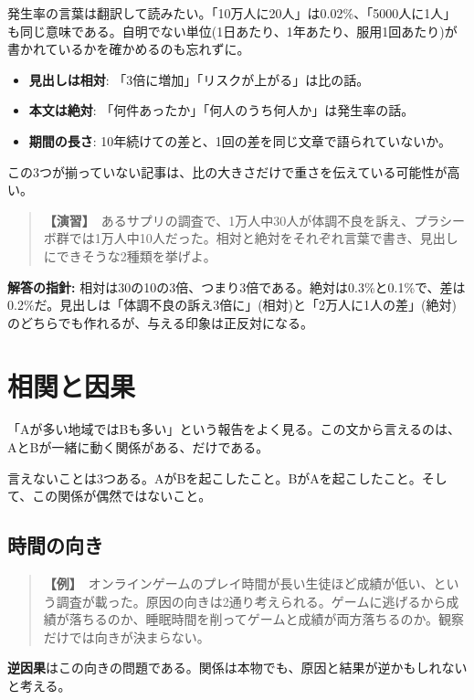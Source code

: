 \documentclass{article}
\begin{document}
発生率の言葉は翻訳して読みたい。「10万人に20人」は0.02\%、「5000人に1人」も同じ意味である。自明でない単位(1日あたり、1年あたり、服用1回あたり)が書かれているかを確かめるのも忘れずに。

\begin{itemize}
\item \textbf{見出しは相対}: 「3倍に増加」「リスクが上がる」は比の話。
\item \textbf{本文は絶対}: 「何件あったか」「何人のうち何人か」は発生率の話。
\item \textbf{期間の長さ}: 10年続けての差と、1回の差を同じ文章で語られていないか。
\end{itemize}

この3つが揃っていない記事は、比の大きさだけで重さを伝えている可能性が高い。

\begin{quote}
\textbf{【演習】}\ あるサプリの調査で、1万人中30人が体調不良を訴え、プラシーボ群では1万人中10人だった。相対と絶対をそれぞれ言葉で書き、見出しにできそうな2種類を挙げよ。
\end{quote}

\textbf{解答の指針:} 相対は30の10の3倍、つまり3倍である。絶対は0.3\%と0.1\%で、差は0.2\%だ。見出しは「体調不良の訴え3倍に」(相対)と「2万人に1人の差」(絶対)のどちらでも作れるが、与える印象は正反対になる。

\section{相関と因果}

「Aが多い地域ではBも多い」という報告をよく見る。この文から言えるのは、AとBが一緒に動く関係がある、だけである。

言えないことは3つある。AがBを起こしたこと。BがAを起こしたこと。そして、この関係が偶然ではないこと。

\subsection{時間の向き}

\begin{quote}
\textbf{【例】}\ オンラインゲームのプレイ時間が長い生徒ほど成績が低い、という調査が載った。原因の向きは2通り考えられる。ゲームに逃げるから成績が落ちるのか、睡眠時間を削ってゲームと成績が両方落ちるのか。観察だけでは向きが決まらない。
\end{quote}

\textbf{逆因果}はこの向きの問題である。関係は本物でも、原因と結果が逆かもしれないと考える。
\end{document}
